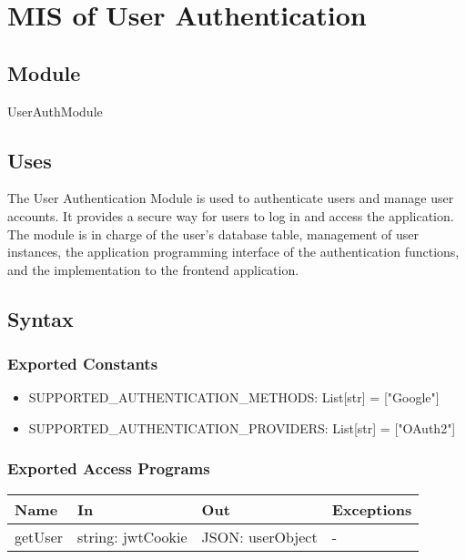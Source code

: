 \documentclass[12pt, titlepage]{article}
\begin{document}
\newpage


\section{MIS of User Authentication} \label{Module} 

\subsection{Module}

UserAuthModule

\subsection{Uses}

The User Authentication Module is used to authenticate users and manage user accounts. It provides a secure way for users to log in and access the application. The module is in charge of the user's database table, management of user instances, the application programming interface of the authentication functions, and the implementation to the frontend application.

\subsection{Syntax}

\subsubsection{Exported Constants}

\begin{itemize}
  \item SUPPORTED{\_}AUTHENTICATION{\_}METHODS: List[str] = ["Google"]
  \item SUPPORTED{\_}AUTHENTICATION{\_}PROVIDERS: List[str] = ["OAuth2"]
\end{itemize}

\subsubsection{Exported Access Programs}

\begin{center}
\begin{tabular}{p{2cm} p{4cm} p{5cm} p{3.5cm}}
\hline
\textbf{Name} & \textbf{In} & \textbf{Out} & \textbf{Exceptions} \\
\hline
getUser & string: jwtCookie & JSON: userObject & - \\
\hline
\end{tabular}
\end{center}
\end{document}
